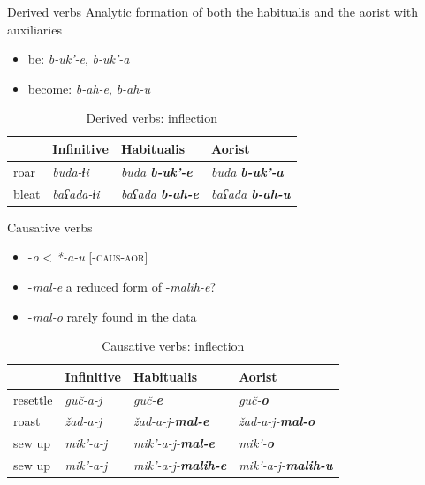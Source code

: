 \begin{frame}{Derived verbs}
Analytic formation of both the habitualis and the aorist with auxiliaries
\begin{itemize}
    \item be: \textit{b-uk'-e}, \textit{b-uk'-a}
    \item become: \textit{b-ah-e}, \textit{b-ah-u}
\end{itemize}
\begin{table}[]
\caption{Derived verbs: inflection}
\centering
\begin{tabular}{l|l|l|l}
      & Infinitive         & Habitualis             & Aorist                 \\ \hline
roar  & \textit{buda-ɬi}   & \textit{buda \textbf{b-uk'-e}}  & \textit{buda \textbf{b-uk'-a}}  \\
bleat & \textit{baʕada-ɬi} & \textit{baʕada \textbf{b-ah-e}} & \textit{baʕada \textbf{b-ah-u}}
\end{tabular}
\end{table}
\end{frame}

\begin{frame}{Causative verbs}
\begin{itemize}
    \item -\textit{o} < \textit{*-a-u} [\textsc{-caus-aor}]
    \item -\textit{mal-e} a reduced form of -\textit{malih-e}?
    \item -\textit{mal-o} rarely found in the data
\end{itemize}
\begin{table}[]
\caption{Causative verbs: inflection}
\centering
\begin{tabular}{l|l|l|l}
         & Infinitive        & Habitualis                & Aorist                    \\ \hline
resettle & \textit{guč-a-j}  & \textit{guč-\textbf{e}}            & \textit{guč-\textbf{o}}            \\
roast    & \textit{žad-a-j}  & \textit{žad-a-j-\textbf{mal-e}}    & \textit{žad-a-j-\textbf{mal-o}}    \\
sew up   & \textit{mik'-a-j} & \textit{mik'-a-j-\textbf{mal-e}}   & \textit{mik'-\textbf{o}}           \\
sew up   & \textit{mik'-a-j} & \textit{mik'-a-j-\textbf{malih-e}} & \textit{mik'-a-j-\textbf{malih-u}}
\end{tabular}
\end{table}
\end{frame}


